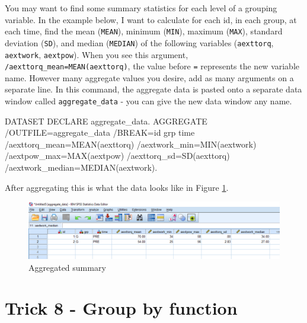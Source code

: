 \documentclass[
]{book}
\newenvironment{Shaded}{\begin{snugshade}}{\end{snugshade}}
\newcommand{\FunctionTok}[1]{\textcolor[rgb]{0.00,0.00,0.00}{#1}}
\newcommand{\NormalTok}[1]{#1}
\newcommand{\OtherTok}[1]{\textcolor[rgb]{0.56,0.35,0.01}{#1}}
\newcommand{\SpecialCharTok}[1]{\textcolor[rgb]{0.00,0.00,0.00}{#1}}
\newcommand{\StringTok}[1]{\textcolor[rgb]{0.31,0.60,0.02}{#1}}
\begin{document}
You may want to find some summary statistics for each level of a grouping variable. In the example below, I want to calculate for each id, in each group, at each time, find the mean (\texttt{MEAN}), minimum (\texttt{MIN}), maximum (\texttt{MAX}), standard deviation (\texttt{SD}), and median (\texttt{MEDIAN}) of the following variables (\texttt{aexttorq}, \texttt{aextwork}, \texttt{aextpow}). When you see this argument, \texttt{/aexttorq\_mean=MEAN(aexttorq)}, the value before \texttt{=} represents the new variable name. However many aggregate values you desire, add as many arguments on a separate line. In this command, the aggregate data is pasted onto a separate data window called \texttt{aggregate\_data} - you can give the new data window any name.

\begin{Shaded}
\begin{Highlighting}[]
\NormalTok{DATASET DECLARE aggregate\_data.}
\NormalTok{AGGREGATE}
  \SpecialCharTok{/}\NormalTok{OUTFILE}\OtherTok{=}\StringTok{\textquotesingle{}aggregate\_data\textquotesingle{}}
  \SpecialCharTok{/}\NormalTok{BREAK}\OtherTok{=}\NormalTok{id grp time }
  \SpecialCharTok{/}\NormalTok{aexttorq\_mean}\OtherTok{=}\FunctionTok{MEAN}\NormalTok{(aexttorq) }
  \SpecialCharTok{/}\NormalTok{aextwork\_min}\OtherTok{=}\FunctionTok{MIN}\NormalTok{(aextwork) }
  \SpecialCharTok{/}\NormalTok{aextpow\_max}\OtherTok{=}\FunctionTok{MAX}\NormalTok{(aextpow) }
  \SpecialCharTok{/}\NormalTok{aexttorq\_sd}\OtherTok{=}\FunctionTok{SD}\NormalTok{(aexttorq) }
  \SpecialCharTok{/}\NormalTok{aextwork\_median}\OtherTok{=}\FunctionTok{MEDIAN}\NormalTok{(aextwork).}
\end{Highlighting}
\end{Shaded}

After aggregating this is what the data looks like in Figure \ref{fig:aggregate}.

\begin{figure}
\includegraphics[width=1\linewidth]{images/aggregate} \caption{Aggregated summary}\label{fig:aggregate}
\end{figure}

\hypertarget{trick8}{%
\chapter{Trick 8 - Group by function}\label{trick8}}
\end{document}
